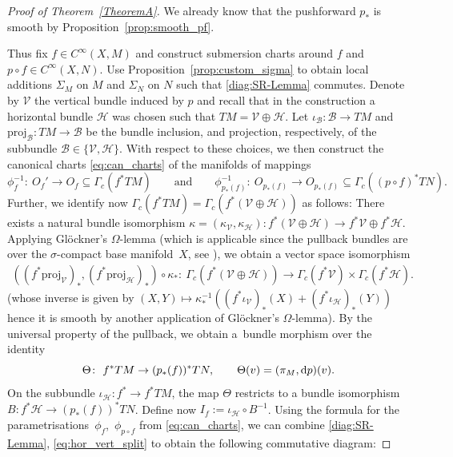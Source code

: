 \documentclass[pdftex]{sigma}
\numberwithin{equation}{section}
\newcommand{\cB}{\ensuremath{\mathcal{B}}}
\newcommand{\cH}{\ensuremath{\mathcal{H}}}
\newcommand{\cV}{\ensuremath{\mathcal{V}}}
\begin{document}
\begin{proof}[Proof of Theorem~\ref{TheoremA}]
We already know that the pushforward $p_\ast$ is smooth by Proposition~\ref{prop:smooth_pf}.

Thus fix $f \in C^\infty (X,M)$ and construct submersion charts around $f$ and $p\circ f \in C^\infty (X,N)$. Use Proposition~\ref{prop:custom_sigma} to obtain local additions $\Sigma_M$ on $M$ and $\Sigma_N$ on $N$ such that \eqref{diag:SR-Lemma} commutes. Denote by $\cV$ the vertical bundle induced by $p$ and recall that in the construction a horizontal bundle $\cH$ was chosen such that $TM = \mathcal{V} \oplus \mathcal{H}$. Let $\iota_\cB \colon \cB \rightarrow TM$ and $\text{proj}_{\cB} \colon TM \rightarrow \cB$ be the bundle inclusion, and projection, respectively, of the subbundle $\cB \in \{\cV, \cH\}$.
With respect to these choices, we then construct the canonical charts \eqref{eq:can_charts} of the manifolds of mappings
\begin{displaymath}
 \phi_f^{-1} \colon\ O_f' \rightarrow O_f \subseteq \Gamma_c (f^{\ast}TM) \qquad\text{and}\qquad \phi_{p_\ast (f)}^{-1}\colon\ O_{p_\ast (f)} \rightarrow O_{p_\ast (f)}\subseteq \Gamma_c ((p\circ f)^\ast TN).
\end{displaymath}
Further, we identify now $\Gamma_c (f^\ast TM)=\Gamma_c (f^\ast (\cV\oplus \cH))$ as follows: There exists a natural bundle isomorphism $\kappa =(\kappa_\cV, \kappa_\cH) \colon f^\ast (\cV \oplus \cH) \rightarrow f^\ast \cV \oplus f^\ast \cH$. Applying Gl\"{o}ckner's $\Omega$-lemma \mbox{\cite[Theorem~F.23]{glo04}} (which is applicable since the pullback bundles are over the $\sigma$-compact base manifold~$X$, see \cite[Lemma F.19\,(c)]{glo04}), we obtain a vector space isomorphism
\begin{align}\label{eq:hor_vert_split}
((f^\ast \text{proj}_\cV)_\ast, (f^\ast \text{proj}_\cH)_\ast) \circ \kappa_\ast \colon\ \Gamma_c (f^\ast (\cV\oplus \cH))\rightarrow \Gamma_c(f^\ast \cV)\times \Gamma_c(f^\ast \cH).
\end{align}
(whose inverse is given by $ (X,Y) \mapsto \kappa^{-1}_\ast ((f^\ast \iota_\cV)_\ast (X) + (f^\ast \iota_{\cH})_\ast (Y))$ hence it is smooth by another application of Gl\"{o}ckner's $\Omega$-lemma).
By the universal property of the pullback, we obtain a~bundle morphism over the identity
\begin{displaymath}
 \Theta \colon\ f^\ast TM \rightarrow (p_\ast(f))^\ast TN,\qquad \Theta (v)=(\pi_M,{\rm d}p)(v).
\end{displaymath}
On the subbundle $\iota_{\cH}\colon f^\ast \rightarrow f^\ast TM$, the map $\Theta$ restricts to a bundle isomorphism $B\colon f^\ast \cH \rightarrow (p_\ast (f))^\ast TN$. Define now $I_f := \iota_{\cH} \circ B^{-1}$. Using the formula for the parametrisations~$\phi_f$,~$\phi_{p\circ f}$ from \eqref{eq:can_charts}, we can combine \eqref{diag:SR-Lemma}, \eqref{eq:hor_vert_split} to obtain the following commutative diagram:

\end{proof}
\end{document}
